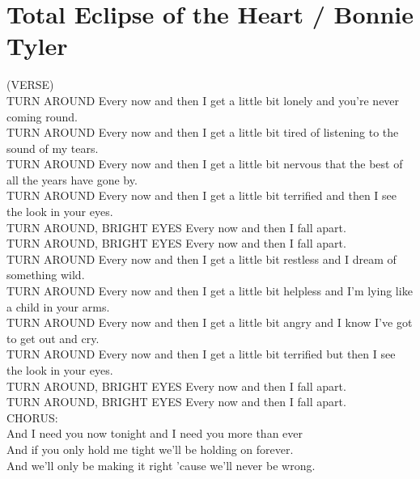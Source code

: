 \section{Total Eclipse of the Heart / Bonnie Tyler}\label{sec:totaleclipseoftheheart}
\Bminor
\Amajor
\DmajorEasy
\Cmajor
\Fmajor
\BflatMajor
\Bmajor
\EmajorEasy
\FsharpMinor
\Fminor

(VERSE)\\
TURN AROUND Every now and then I get a little bit lonely and you're never coming round.\\
TURN AROUND Every now and then I get a little bit tired of listening to the sound of my tears.\\
TURN AROUND Every now and then I get a little bit nervous that the best of all the years have gone by.\\
TURN AROUND Every now and then I get a little bit terrified and then I see the look in your eyes.\\
TURN AROUND, BRIGHT EYES Every now and then I fall apart.\\
TURN AROUND, BRIGHT EYES Every now and then I fall apart.\\
TURN AROUND Every now and then I get a little bit restless and I dream of something wild.\\
TURN AROUND Every now and then I get a little bit helpless and I'm lying like a child in your arms.\\
TURN AROUND Every now and then I get a little bit angry and I know I've got to get out and cry.\\
TURN AROUND Every now and then I get a little bit terrified but then I see the look in your eyes.\\
TURN AROUND, BRIGHT EYES Every now and then I fall apart.\\
TURN AROUND, BRIGHT EYES Every now and then I fall apart.\\
CHORUS:\\
And I need you now tonight and I need you more than ever\\
And if you only hold me tight we'll be holding on forever.\\
And we'll only be making it right 'cause we'll never be wrong.\\
